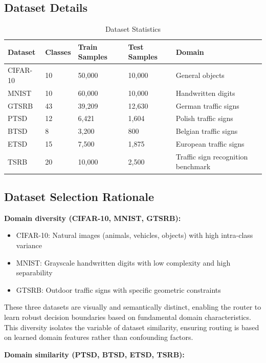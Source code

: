 \documentclass[11pt,a4paper]{article}
\begin{document}
\subsection{Dataset Details}

\begin{table}[H]
\centering
\small
\begin{tabular}{lllll}
\toprule
\textbf{Dataset} & \textbf{Classes} & \textbf{Train Samples} & \textbf{Test Samples} & \textbf{Domain} \\
\midrule
CIFAR-10 & 10 & 50,000 & 10,000 & General objects \\
MNIST & 10 & 60,000 & 10,000 & Handwritten digits \\
GTSRB & 43 & 39,209 & 12,630 & German traffic signs \\
PTSD & 12 & 6,421 & 1,604 & Polish traffic signs \\
BTSD & 8 & 3,200 & 800 & Belgian traffic signs \\
ETSD & 15 & 7,500 & 1,875 & European traffic signs \\
TSRB & 20 & 10,000 & 2,500 & Traffic sign recognition benchmark \\
\bottomrule
\end{tabular}
\caption{Dataset Statistics}
\end{table}

\subsection{Dataset Selection Rationale}

\textbf{Domain diversity (CIFAR-10, MNIST, GTSRB):}
\begin{itemize}
    \item CIFAR-10: Natural images (animals, vehicles, objects) with high intra-class variance
    \item MNIST: Grayscale handwritten digits with low complexity and high separability
    \item GTSRB: Outdoor traffic signs with specific geometric constraints
\end{itemize}

These three datasets are visually and semantically distinct, enabling the router to learn robust decision boundaries based on fundamental domain characteristics. This diversity isolates the variable of dataset similarity, ensuring routing is based on learned domain features rather than confounding factors.

\textbf{Domain similarity (PTSD, BTSD, ETSD, TSRB):}
\end{document}
